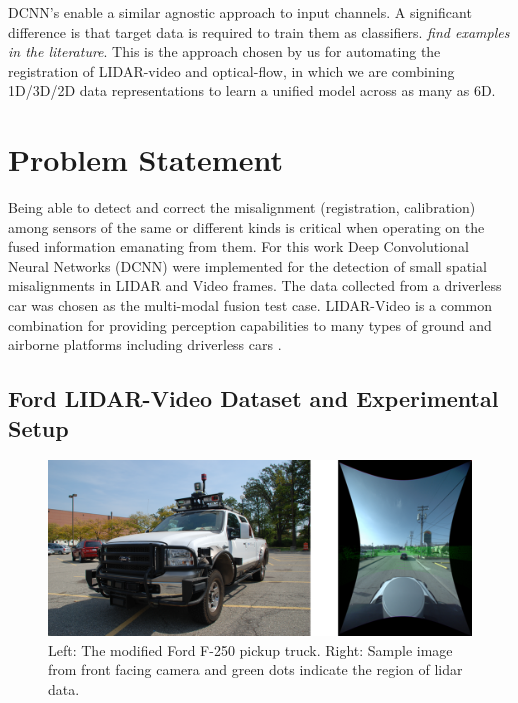 \documentclass{article}
\begin{document}
DCNN's enable a similar agnostic approach to input channels. A significant difference is that target data is required to train them as classifiers. \emph{find examples in the literature}. This is the approach chosen by us for automating the registration of LIDAR-video and optical-flow, in which we are combining 1D/3D/2D data representations to learn a unified model across as many as 6D. 




\section{Problem Statement} %
\label{sec:problem_statement}

Being able to detect and correct the misalignment (registration, calibration) among sensors of the same or different kinds is critical when operating on the fused information emanating from them. For this work Deep Convolutional Neural Networks (DCNN) were implemented for the detection of small spatial misalignments in LIDAR and Video frames. The data collected from a driverless car was chosen as the multi-modal fusion test case. LIDAR-Video is a common combination for providing perception capabilities to many types of ground and airborne platforms including driverless cars \cite{Thrun2011Googles-dr}. 

\subsection{Ford LIDAR-Video Dataset and Experimental Setup} %
\label{sub:ford_lidar_video_dataset_and_experimental_setup}

\begin{figure}[htbp]
    \centering
        \includegraphics[scale=0.45]{Figures/ford-truck-sensors-final.png}
    \caption{Left: The modified Ford F-250 pickup truck. Right: Sample image from front facing camera and green dots indicate the region of lidar data.}
    \label{fig:ford-truck-sensors}
\end{figure}
\end{document}

